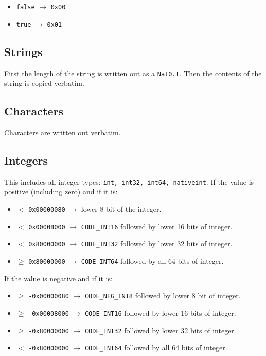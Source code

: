 \documentclass[12pt]{article}
\begin{document}
\begin{itemize}
\item \verb=false= $\rightarrow$ \verb=0x00=
\item \verb=true= $\rightarrow$ \verb=0x01=
\end{itemize}

\subsection{Strings}

First the length of the string is written out as a \verb=Nat0.t=.
Then the contents of the string is copied verbatim.

\subsection{Characters}

Characters are written out verbatim.

\subsection{Integers}

This includes all integer types: \verb=int, int32, int64, nativeint=.
If the value is positive (including zero) and if it is:

\begin{itemize}
\item $<$ \verb=0x00000080= $\rightarrow$ lower 8 bit of the integer.
\item $<$ \verb=0x00008000= $\rightarrow$ \verb=CODE_INT16= followed by lower 16 bits of integer.
\item $<$ \verb=0x80000000= $\rightarrow$ \verb=CODE_INT32= followed by lower 32 bits of integer.
\item $\geq$ \verb=0x80000000= $\rightarrow$ \verb=CODE_INT64= followed by all 64 bits of integer.
\end{itemize}

\noindent If the value is negative and if it is:

\begin{itemize}
\item $\geq$ \verb=-0x00000080= $\rightarrow$ \verb=CODE_NEG_INT8= followed by lower 8 bit of integer.
\item $\geq$ \verb=-0x00008000= $\rightarrow$ \verb=CODE_INT16= followed by lower 16 bits of integer.
\item $\geq$ \verb=-0x80000000= $\rightarrow$ \verb=CODE_INT32= followed by lower 32 bits of integer.
\item $<$ \verb=-0x80000000= $\rightarrow$ \verb=CODE_INT64= followed by all 64 bits of integer.
\end{itemize}
\end{document}
